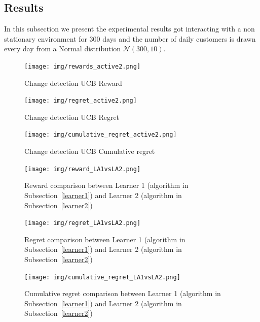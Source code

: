 \subsection{Results}
In this subsection we present the experimental results got interacting with a non stationary environment for 300 days and the number of daily customers is drawn every day from a Normal distribution $\mathcal{N}(300, 10)$.
\begin{figure}[ht]
    \begin{center}
    \texttt{[image: img/rewards\_active2.png]}
    \caption{Change detection UCB Reward}
    \label{fig:reward61}
    \end{center}
\end{figure}
\begin{multicols}{2}
    \begin{figure}[H]
        \begin{center}
        \texttt{[image: img/regret\_active2.png]}
        \caption{Change detection UCB Regret}
        \label{fig:regret61}
        \end{center}
    \end{figure}
    \columnbreak
    \begin{figure}[H]
        \begin{center}
        \texttt{[image: img/cumulative\_regret\_active2.png]}
        \caption{Change detection UCB Cumulative regret}
        \label{fig:cum_reg61}
        \end{center}
    \end{figure}
\end{multicols}

\begin{figure}[ht]
    \begin{center}
    \texttt{[image: img/reward\_LA1vsLA2.png]}
    \caption{Reward comparison between Learner 1 (algorithm in Subsection~\ref{learner1}) and Learner 2 (algorithm in Subsection~\ref{learner2})}
    \label{fig:reward62}
    \end{center}
\end{figure}
\begin{multicols}{2}
    \begin{figure}[H]
        \begin{center}
        \texttt{[image: img/regret\_LA1vsLA2.png]}
        \caption{Regret comparison between Learner 1 (algorithm in Subsection~\ref{learner1}) and Learner 2 (algorithm in Subsection~\ref{learner2})}
        \label{fig:regret62}
        \end{center}
    \end{figure}
    \columnbreak
    \begin{figure}[H]
        \begin{center}
        \texttt{[image: img/cumulative\_regret\_LA1vsLA2.png]}
        \caption{Cumulative regret comparison between Learner 1 (algorithm in Subsection~\ref{learner1}) and Learner 2 (algorithm in Subsection~\ref{learner2})}
        \label{fig:cum_reg62}
        \end{center}
    \end{figure}
\end{multicols}


